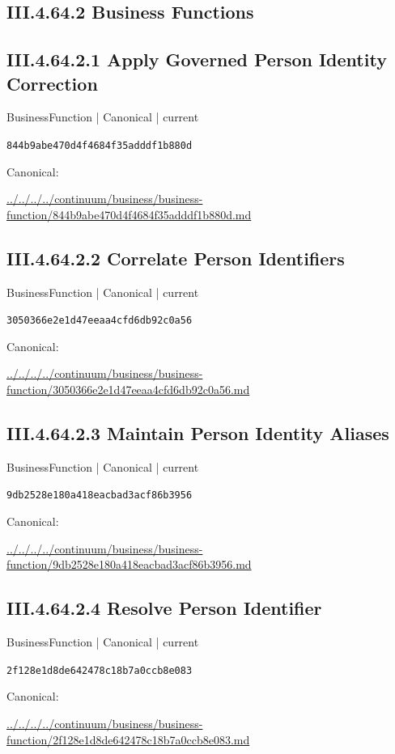 \documentclass[10pt,a4paper]{article}
\begin{document}
\subsection*{III.4.64.2 Business Functions}
\subsection*{III.4.64.2.1 Apply Governed Person Identity Correction}
{\small BusinessFunction | Canonical | current}\par
\texttt{844b9abe470d4f4684f35adddf1b880d}\par
Canonical: \par
{\footnotesize\url{../../../../continuum/business/business-function/844b9abe470d4f4684f35adddf1b880d.md}}\par
\subsection*{III.4.64.2.2 Correlate Person Identifiers}
{\small BusinessFunction | Canonical | current}\par
\texttt{3050366e2e1d47eeaa4cfd6db92c0a56}\par
Canonical: \par
{\footnotesize\url{../../../../continuum/business/business-function/3050366e2e1d47eeaa4cfd6db92c0a56.md}}\par
\subsection*{III.4.64.2.3 Maintain Person Identity Aliases}
{\small BusinessFunction | Canonical | current}\par
\texttt{9db2528e180a418eacbad3acf86b3956}\par
Canonical: \par
{\footnotesize\url{../../../../continuum/business/business-function/9db2528e180a418eacbad3acf86b3956.md}}\par
\subsection*{III.4.64.2.4 Resolve Person Identifier}
{\small BusinessFunction | Canonical | current}\par
\texttt{2f128e1d8de642478c18b7a0ccb8e083}\par
Canonical: \par
{\footnotesize\url{../../../../continuum/business/business-function/2f128e1d8de642478c18b7a0ccb8e083.md}}\par
\end{document}
